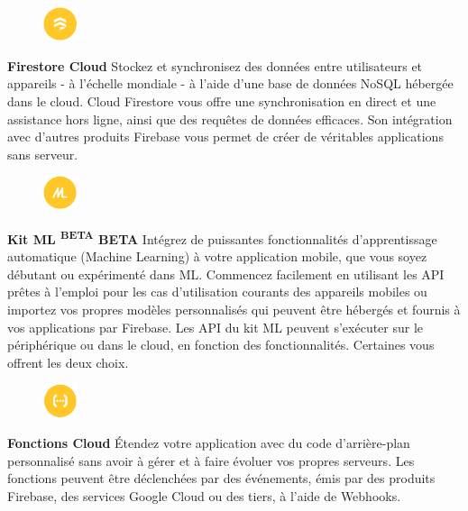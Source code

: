 \begin{figure}
	\includegraphics[width=1cm]{Images/chapter2/firebase_services/firestore.png}
\end{figure}
\textbf{Firestore Cloud} Stockez et synchronisez des données entre utilisateurs et appareils - à l'échelle mondiale - à l'aide d'une base de données NoSQL hébergée dans le cloud. Cloud Firestore vous offre une synchronisation en direct et une assistance hors ligne, ainsi que des requêtes de données efficaces. Son intégration avec d'autres produits Firebase vous permet de créer de véritables applications sans serveur.\medskip

\begin{figure}
	\includegraphics[width=1cm]{Images/chapter2/firebase_services/mlkit.png}
\end{figure}
\textbf{Kit ML \textsuperscript{BETA} \acrshort{BETA}} Intégrez de puissantes fonctionnalités d'apprentissage automatique (Machine Learning) à votre application mobile, que vous soyez débutant ou expérimenté dans \acrshort{ML}. Commencez facilement en utilisant les API prêtes à l'emploi pour les cas d'utilisation courants des appareils mobiles ou importez vos propres modèles personnalisés qui peuvent être hébergés et fournis à vos applications par Firebase. Les API du kit ML peuvent s'exécuter sur le périphérique ou dans le cloud, en fonction des fonctionnalités. Certaines vous offrent les deux choix.\medskip\\

\begin{figure}
	\includegraphics[width=1cm]{Images/chapter2/firebase_services/cloud_function.png}
\end{figure}
\textbf{Fonctions Cloud} Étendez votre application avec du code d’arrière-plan personnalisé sans avoir à gérer et à faire évoluer vos propres serveurs. Les fonctions peuvent être déclenchées par des événements, émis par des produits Firebase, des services Google Cloud ou des tiers, à l'aide de \gls{Webhook}s.\medskip


